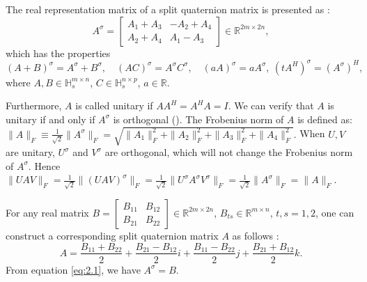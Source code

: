\documentclass[12pt]{article}
\numberwithin{equation}{section} %
\begin{document}
The real representation matrix of a split quaternion matrix is presented as \cite{TJiang2015}:
\begin{equation}
{A}^\sigma = \begin{bmatrix} A_1 + A_3 & -A_2 + A_4 \\ A_2 + A_4 & A_1 - A_3 \end{bmatrix} \in \mathbb{R}^{2m \times 2n},\label{eq:2.1}
\end{equation}
which has the properties
\begin{equation}
    ({A} + {B})^\sigma = {A}^\sigma + {B}^\sigma, \quad ({A}{C})^\sigma = {A}^\sigma {C}^\sigma, \quad (a {A})^\sigma = a {A}^\sigma, \ (t{A}^H)^\sigma = ({A}^\sigma)^H\label{eq:2.1.1},
\end{equation}
where ${A}, {B} \in \mathbb{H}_s^{m \times n}$, ${C} \in \mathbb{H}_s^{n \times p}$, $a \in \mathbb{R}$.

Furthermore,  \({A}\) is called unitary if \({A}{A}^H = {A}^H {A} = I\). We can verify that \(A\) is unitary if and only if  \({A}^\sigma\) is  orthogonal (\cite{TJiang2018}).
 The Frobenius norm of \({A}\) is defined as: $ \| {A} \|_F \equiv \frac{1}{\sqrt{2}} \| {A}^\sigma \|_F = \sqrt{\| A_1 \|_F^2 + \| A_2 \|_F^2 + \| A_3 \|_F^2 + \| A_4 \|_F^2}.$ When ${U}, {V}$ are unitary, ${U}^\sigma$ and ${V}^\sigma$ are orthogonal, which will not change the Frobenius norm  of $A^\sigma$. Hence
$\|{U}{A}{V}\|_F = \frac{1}{\sqrt{2}} \|({U}{A}{V})^\sigma\|_F 
= \frac{1}{\sqrt{2}} \|{U}^\sigma {A}^\sigma {V}^\sigma\|_F
=\frac{1}{\sqrt{2}} \|{A}^\sigma\|_F
= \|{A}\|_F.$

For any real matrix $B = \begin{bmatrix} B_{11} & B_{12} \\ B_{21} & B_{22} \end{bmatrix} \in \mathbb{R}^{2m \times 2n}$, $B_{ts} \in \mathbb{R}^{m \times n}$, $t, s = 1, 2$, one can construct a corresponding split quaternion matrix \(A\) as follows \cite{TJiang2015}:
\begin{equation}
{A} = \frac{B_{11} + B_{22}}{2} + \frac{B_{21} - B_{12}}{2}i + \frac{B_{11} - B_{22}}{2}j + \frac{B_{21} + B_{12}}{2}k.\label{eq:2.2}
\end{equation}
From equation \eqref{eq:2.1}, we have ${A}^\sigma = B$. 
\end{document}
